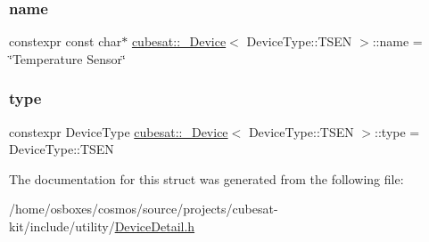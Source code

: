 \subsubsection{\texorpdfstring{name}{name}}
{\footnotesize\ttfamily constexpr const char$\ast$ \hyperlink{structcubesat_1_1__Device}{cubesat\+::\+\_\+\+Device}$<$ Device\+Type\+::\+T\+S\+EN $>$\+::name = \char`\"{}Temperature Sensor\char`\"{}\hspace{0.3cm}{\ttfamily [static]}}

\mbox{\label{structcubesat_1_1__Device_3_01DeviceType_1_1TSEN_01_4_af57f7ba7f2c1b9305b64a89bacf03ca5}} 
\subsubsection{\texorpdfstring{type}{type}}
{\footnotesize\ttfamily constexpr Device\+Type \hyperlink{structcubesat_1_1__Device}{cubesat\+::\+\_\+\+Device}$<$ Device\+Type\+::\+T\+S\+EN $>$\+::type = Device\+Type\+::\+T\+S\+EN\hspace{0.3cm}{\ttfamily [static]}}



The documentation for this struct was generated from the following file\+:\begin{DoxyCompactItemize}
\item 
/home/osboxes/cosmos/source/projects/cubesat-\/kit/include/utility/\hyperlink{DeviceDetail_8h}{Device\+Detail.\+h}\end{DoxyCompactItemize}
